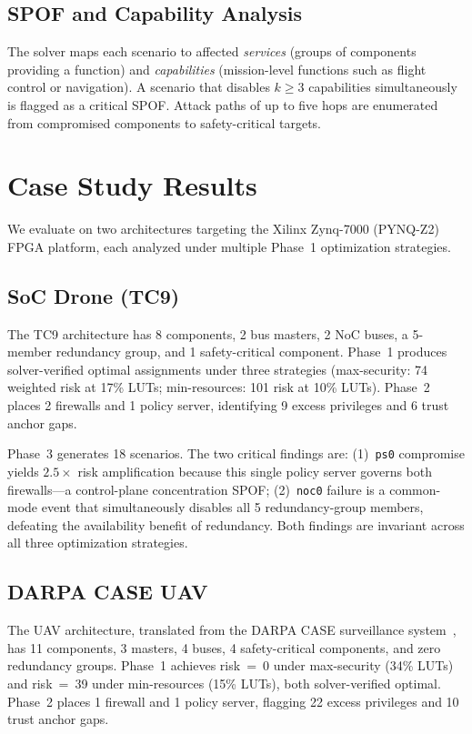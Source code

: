 \documentclass[conference]{IEEEtran}
\begin{document}
\subsection{SPOF and Capability Analysis}

The solver maps each scenario to affected \emph{services} (groups of
components providing a function) and \emph{capabilities} (mission-level
functions such as flight control or navigation). A scenario that disables
$k \ge 3$ capabilities simultaneously is flagged as a critical SPOF.
Attack paths of up to five hops are enumerated from compromised
components to safety-critical targets.

\section{Case Study Results}

We evaluate on two architectures targeting the Xilinx Zynq-7000
(PYNQ-Z2) FPGA platform, each analyzed under multiple Phase~1
optimization strategies.

\subsection{SoC Drone (TC9)}

The TC9 architecture has 8 components, 2 bus masters, 2 NoC buses, a
5-member redundancy group, and 1 safety-critical component. Phase~1
produces solver-verified optimal assignments under three strategies
(max-security: 74 weighted risk at 17\% LUTs; min-resources: 101 risk at
10\% LUTs). Phase~2 places 2 firewalls and 1 policy server, identifying
9 excess privileges and 6 trust anchor gaps.

Phase~3 generates 18 scenarios. The two critical findings are:
(1)~\texttt{ps0} compromise yields $2.5\times$ risk amplification because
this single policy server governs both firewalls---a control-plane
concentration SPOF; (2)~\texttt{noc0} failure is a common-mode event that
simultaneously disables all 5 redundancy-group members, defeating the
availability benefit of redundancy. Both findings are invariant across
all three optimization strategies.

\subsection{DARPA CASE UAV}

The UAV architecture, translated from the DARPA CASE surveillance
system~\cite{darpa_case,hasan_saecps}, has 11 components, 3 masters,
4 buses, 4 safety-critical components, and zero redundancy groups.
Phase~1 achieves risk~=~0 under max-security (34\% LUTs) and
risk~=~39 under min-resources (15\% LUTs), both solver-verified optimal.
Phase~2 places 1 firewall and 1 policy server, flagging 22 excess
privileges and 10 trust anchor gaps.
\end{document}

